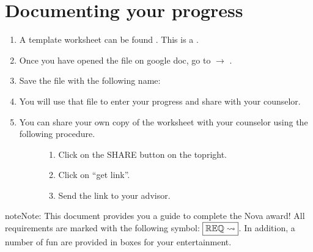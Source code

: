 \documentclass[letterpaper,10pt,english,openany,oneside]{sphinxmanual}
\begin{document}
\section{Documenting your progress}
\label{\detokenize{introduction:documenting-your-progress}}\begin{enumerate}
%
\item {} 
A template worksheet can be found . This is a . 

\item {} 
Once you have opened the file on google doc, go to  \(\rightarrow\) .

\item {} 
Save the file with the following name: 

\item {} 
You will use that file to enter your progress and share with your counselor.

\item {} \begin{description}
\item[{You can share your own copy of the worksheet with your counselor using the following procedure.}] \leavevmode\begin{enumerate}
%
\item {} 
Click on the SHARE button on the top\sphinxhyphen{}right.

\item {} 
Click on “get link”.

\item {} 
Send the link to your advisor.

\end{enumerate}

\end{description}

\end{enumerate}

\begin{sphinxadmonition}{note}{Note:}
This document provides you a guide to complete the Nova award! All requirements are marked with the following symbol: \(\boxed{\mathbb{REQ}\Large \rightsquigarrow}\). In addition, a number of fun  are provided in boxes for your entertainment.
\end{sphinxadmonition}
\end{document}
